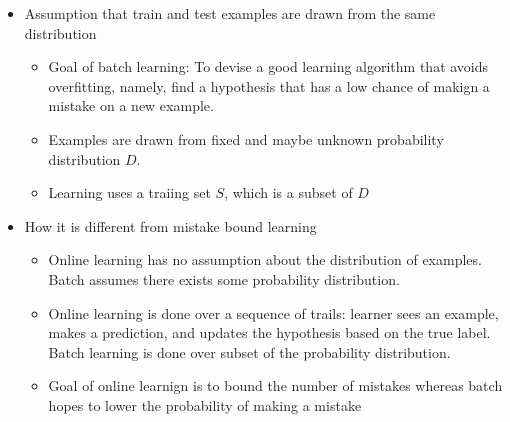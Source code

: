\documentclass{article}
\begin{document}
\hspace{-1.5em}{\large \bf Batch Learning}
\begin{itemize}
\item Assumption that train and test examples are drawn from the same distribution 
	\begin{itemize}
	\item Goal of batch learning: To devise a good learning algorithm that avoids overfitting, namely, find a hypothesis that has a low chance of makign a mistake on a new example.
	\item Examples are drawn from fixed and maybe unknown probability distribution $D$.
	\item Learning uses a traiing set $S$, which is a subset of $D$
	\end{itemize}
\item How it is different from mistake bound learning
	\begin{itemize}
	\item Online learning has no assumption about the distribution of examples. Batch assumes there exists some probability distribution. 
	\item Online learning is done over a sequence of trails: learner sees an example, makes a prediction, and updates the hypothesis based on the true label. Batch learning is done over subset  of the probability distribution. 
	\item Goal of online learnign is to bound the number of mistakes whereas batch hopes to lower the probability of making a mistake
	\end{itemize}
\end{itemize}
\end{document}
